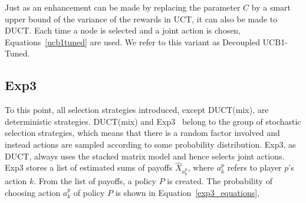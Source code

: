 \documentclass{article}
\begin{document}


Just as an enhancement can be made by replacing the parameter $C$ by a smart upper bound of the variance of the rewards in UCT, it can also be made to DUCT. Each time a node is selected and a joint action is chosen, Equations~\ref{ucb1tuned} are used. We refer to this variant as Decoupled UCB1-Tuned.

\subsection{Exp3}
\label{subsec:exp3}

To this point, all selection strategies introduced, except DUCT(mix), are deterministic strategies. DUCT(mix) and Exp3~\cite{Exp3} belong to the group of stochastic selection strategies, which means that there is a random factor involved and instead actions are sampled according to some probability distribution. %
Exp3, as DUCT, always uses the stacked matrix model and hence selects joint actions.
Exp3 stores a list of estimated sums of payoffs $\hat{X}_{a^{p}_{k}}$, where $a^{p}_{k}$ refers to player $p$'s action $k$. From the list of payoffs, a policy $P$ is created. The probability of choosing action $a^{p}_{k}$ of policy $P$ is shown in Equation~\ref{exp3_equations}, 
\end{document}
